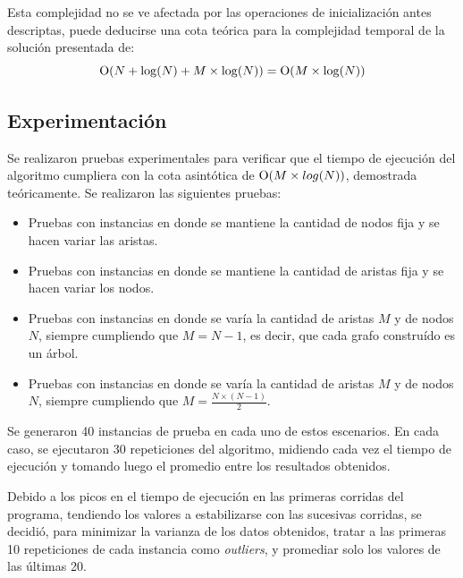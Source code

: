     Esta complejidad no se ve afectada por las operaciones de inicialización
    antes descriptas, puede deducirse una cota teórica para
    la complejidad temporal de la solución presentada de:
    \[ \operatorname{O}(N + \log(N) + M \times \log(N)) = \operatorname{O}(M \times \log(N)) \]

    \subsection{Experimentación}

    Se realizaron pruebas experimentales para verificar que el tiempo de ejecución del algoritmo cumpliera con la cota asintótica de $\operatorname{O}(M \times log(N))$, demostrada teóricamente. Se realizaron las siguientes pruebas:

    \begin{itemize}
    \item Pruebas con instancias en donde se mantiene la cantidad de nodos fija y se hacen variar las aristas.
    \item Pruebas con instancias en donde se mantiene la cantidad de aristas fija y se hacen variar los nodos.
    \item Pruebas con instancias en donde se varía la cantidad de aristas $M$ y de nodos $N$, siempre cumpliendo que $M = N  - 1$, es decir, que cada grafo construído es un árbol.
    \item Pruebas con instancias en donde se varía la cantidad de aristas $M$ y de nodos $N$, siempre cumpliendo que $M = \frac{N \times (N - 1)}{2}$.
    \end{itemize}

    Se generaron 40 instancias de prueba en cada uno de estos escenarios. En cada caso, se ejecutaron 30 repeticiones del algoritmo, midiendo cada vez el tiempo de ejecución y tomando luego el promedio entre los resultados obtenidos.

    Debido a los picos en el tiempo de ejecución en las primeras corridas del programa, tendiendo los valores a estabilizarse con las sucesivas corridas, se decidió, para minimizar la varianza de los datos obtenidos, tratar a las primeras 10 repeticiones de cada instancia como \textit{outliers}, y promediar solo los valores de las últimas 20.


